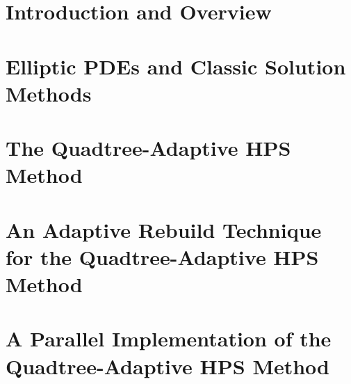 \documentclass[12pt,twoside]{report}
\begin{document}

\begintext
\chapter{Introduction and Overview}
\label{chap:intro}





\chapter{Elliptic PDEs and Classic Solution Methods}
\label{chap:elliptic-pdes}




\chapter{The Quadtree-Adaptive HPS Method}
\label{chap:qahps}







\chapter{An Adaptive Rebuild Technique for the Quadtree-Adaptive HPS Method}
\label{chap:adaptive-build}

% 




\chapter{A Parallel Implementation of the Quadtree-Adaptive HPS Method}
\label{chap:parallel}




\end{document}
